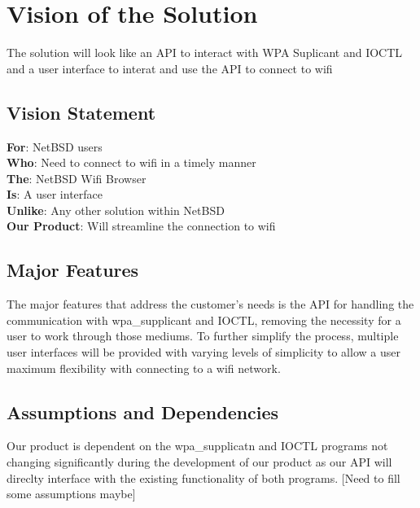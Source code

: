 \section{Vision of the Solution}

The solution will look like an API to interact with WPA Suplicant and IOCTL and a user interface to interat and use the API to connect to wifi

\subsection{Vision Statement}
%

\textbf{For}: NetBSD users\\
\textbf{Who}: Need to connect to wifi in a timely manner\\
\textbf{The}: NetBSD Wifi Browser\\
\textbf{Is}: A user interface\\
\textbf{Unlike}: Any other solution within NetBSD\\
\textbf{Our Product}: Will streamline the connection to wifi
  
\subsection{Major Features}
The major features that address the customer's needs is the API for handling the communication with wpa\_supplicant and IOCTL, removing the necessity for a user to work through those mediums. To further simplify the process, multiple user interfaces will be provided with varying levels of simplicity to allow a user maximum flexibility with connecting to a wifi network.

\subsection{Assumptions and Dependencies}

Our product is dependent on the wpa\_supplicatn and IOCTL programs not changing significantly during the development of our product as our API will direclty interface with the existing functionality of both programs. [Need to fill some assumptions maybe]
